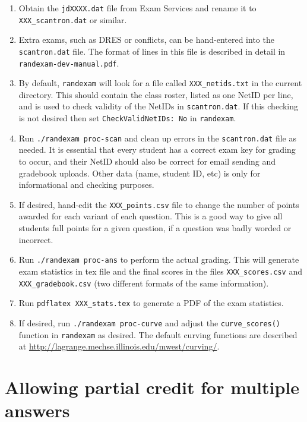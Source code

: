 \documentclass{article}
\begin{document}
\begin{enumerate}
\item Obtain the \texttt{jdXXXX.dat} file from Exam Services and
  rename it to \texttt{XXX_scantron.dat} or similar.
\item Extra exams, such as DRES or conflicts, can be hand-entered into
  the \texttt{scantron.dat} file. The format of lines in this file is
  described in detail in \texttt{randexam-dev-manual.pdf}.
\item By default, \texttt{randexam} will look for a file called
  \texttt{XXX_netids.txt} in the current directory. This should
  contain the class roster, listed as one NetID per line, and is used
  to check validity of the NetIDs in \texttt{scantron.dat}. If this
  checking is not desired then set \texttt{CheckValidNetIDs: No}
  in \texttt{randexam}.
\item Run \texttt{./randexam proc-scan} and clean up errors in the
  \texttt{scantron.dat} file as needed. It is essential that every
  student has a correct exam key for grading to occur, and their NetID
  should also be correct for email sending and gradebook
  uploads. Other data (name, student ID, etc) is only for
  informational and checking purposes.
\item If desired, hand-edit the \texttt{XXX_points.csv} file to change the
  number of points awarded for each variant of each question. This is
  a good way to give all students full points for a given question, if
  a question was badly worded or incorrect.
\item Run \texttt{./randexam proc-ans} to perform the actual
  grading. This will generate exam statistics in tex file and the
  final scores in the files \texttt{XXX_scores.csv} and
  \texttt{XXX_gradebook.csv} (two different formats of the same
  information).
\item Run \texttt{pdflatex XXX_stats.tex} to generate a PDF of the
  exam statistics.
\item If desired, run \texttt{./randexam proc-curve} and adjust the
  \texttt{curve_scores()} function in \texttt{randexam} as
  desired. The default curving functions are described at
  \url{http://lagrange.mechse.illinois.edu/mwest/curving/}.
\end{enumerate}

\section{Allowing partial credit for multiple answers}
\end{document}
